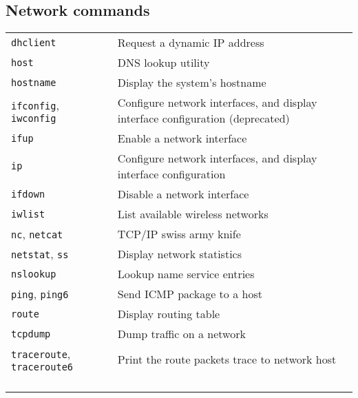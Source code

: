 \documentclass[10pt]{article}
\begin{document}
\begin{multicols}{2}

\section{Network commands}
\begin{tabular}{ p{2.5cm} p{8.5cm} }
  \hline
  \texttt{dhclient} & Request a dynamic IP address \\
  \rowcolor{Gray}
  \texttt{host} & DNS lookup utility \\
  \texttt{hostname} & Display the system's hostname \\
  \rowcolor{Gray}
  \texttt{ifconfig}, \texttt{iwconfig} & Configure network interfaces, and display interface configuration (deprecated)\\
  \texttt{ifup} & Enable a network interface \\
  \rowcolor{Gray}
  \texttt{ip} & Configure network interfaces, and display interface configuration \\
  \texttt{ifdown} & Disable a network interface \\
  \rowcolor{Gray}
  \texttt{iwlist} & List available wireless networks \\
  \texttt{nc}, \texttt{netcat} & TCP/IP swiss army knife \\
  \rowcolor{Gray}
  \texttt{netstat}, \texttt{ss} & Display network statistics \\
  \texttt{nslookup} & Lookup name service entries \\
  \rowcolor{Gray}
  \texttt{ping}, \texttt{ping6} & Send ICMP package to a host \\
  \texttt{route} & Display routing table \\
  \rowcolor{Gray}
  \texttt{tcpdump} & Dump traffic on a network \\
  \texttt{traceroute}, \texttt{traceroute6} & Print the route packets trace to network host\\
  \hline
  & \\
  & \\
  & \\
  & \\
\end{tabular}


\end{multicols}
\end{document}
